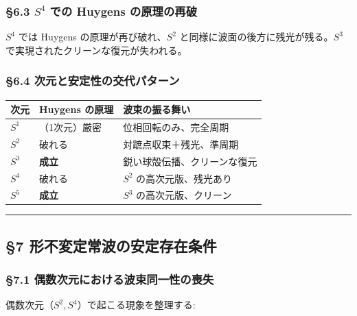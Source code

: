 \documentclass[
  a4paper,11pt]{ltjsarticle}
\newcounter{none}
\theoremstyle{definition}
\theoremstyle{remark}
\begin{document}
\subsubsection{\texorpdfstring{§6.3 \(S^4\) での Huygens
の原理の再破}{§6.3 S\^{}4 での Huygens の原理の再破}}\label{s4-ux3067ux306e-huygens-ux306eux539fux7406ux306eux518dux7834}

\(S^4\) では Huygens の原理が再び破れ、\(S^2\)
と同様に波面の後方に残光が残る。\(S^3\)
で実現されたクリーンな復元が失われる。

\subsubsection{§6.4
次元と安定性の交代パターン}\label{ux6b21ux5143ux3068ux5b89ux5b9aux6027ux306eux4ea4ux4ee3ux30d1ux30bfux30fcux30f3}

{\def\LTcaptype{none} %
\begin{longtable}[]{@{}lll@{}}
\toprule\noalign{}
次元 & Huygens の原理 & 波束の振る舞い \\
\midrule\noalign{}
\endhead
\bottomrule\noalign{}
\endlastfoot
\(S^1\) & （1次元）厳密 & 位相回転のみ、完全周期 \\
\(S^2\) & 破れる & 対蹠点収束＋残光、準周期 \\
\(S^3\) & \textbf{成立} & 鋭い球殻伝播、クリーンな復元 \\
\(S^4\) & 破れる & \(S^2\) の高次元版、残光あり \\
\(S^5\) & \textbf{成立} & \(S^3\) の高次元版、クリーン \\
\end{longtable}
}

\begin{center}\rule{0.5\linewidth}{0.5pt}\end{center}

\subsection{§7
形不変定常波の安定存在条件}\label{ux5f62ux4e0dux5909ux5b9aux5e38ux6ce2ux306eux5b89ux5b9aux5b58ux5728ux6761ux4ef6}

\subsubsection{§7.1
偶数次元における波束同一性の喪失}\label{ux5076ux6570ux6b21ux5143ux306bux304aux3051ux308bux6ce2ux675fux540cux4e00ux6027ux306eux55aaux5931}

偶数次元（\(S^2, S^4\)）で起こる現象を整理する:
\end{document}
